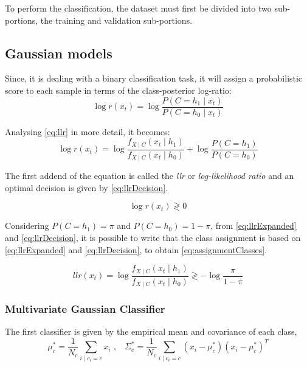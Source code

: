 
To perform the classification, the dataset must first be divided into two sub-portions, the training and validation sub-portions.

\subsection{Gaussian models}
\label{subsec:gaussianModels}
Since, it is dealing with a binary classification task, it will assign a probabilistic score to each sample in terms
of the class-posterior log-ratio:
\begin{equation}
    \log r(x_t) = \log \frac{P(C=h_1\mid x_t)}{P(C=h_0\mid x_t)}
    \label{eq:llr}
\end{equation}

Analysing \autoref{eq:llr} in more detail, it becomes:
\begin{equation}
    \log r(x_t) = \log \frac{f_{X\mid C}(x_t \mid h_1)}{f_{X\mid C}(x_t \mid h_0)} + \log \frac{P(C=h_1)}{P(C=h_0)}
    \label{eq:llrExpanded}
\end{equation}

The first addend of the equation is called the \textit{llr} or \textit{log-likelihood ratio} and an optimal decision is
given by \autoref{eq:llrDecision}.

\begin{equation}
    \log r(x_t) \gtrless 0
    \label{eq:llrDecision}
\end{equation}

Considering \(P(C=h_1) = \pi \) and \(P(C=h_0) = 1 - \pi\), from \autoref{eq:llrExpanded} and \autoref{eq:llrDecision},
it is possible to write that the class assignment is based on \autoref{eq:llrExpanded} and \autoref{eq:llrDecision},
to obtain \autoref{eq:assignmentClasses}.

\begin{equation}
    llr(x_t)=\log \frac{f_{X\mid C}(x_t \mid h_1)}{f_{X\mid C}(x_t \mid h_0)} \gtrless -\log \frac{\pi}{1 - \pi}
    \label{eq:assignmentClasses}
\end{equation}


\subsubsection{Multivariate Gaussian Classifier}
\label{subsubsec:multivariateGaussianClassifier}
The first classifier is given by the empirical mean and covariance of each class,
\begin{equation}
    \mu_c^* = \frac{1}{N_c} \sum_{i\mid c_i=c} x_i\text{ ,}\quad
    \Sigma_c^* = \frac{1}{N_c} \sum_{i\mid c_i=c} (x_i - \mu_c^*)(x_i - \mu_c^*)^T
    \label{eq:meanAndVarianceMVG}
\end{equation}

